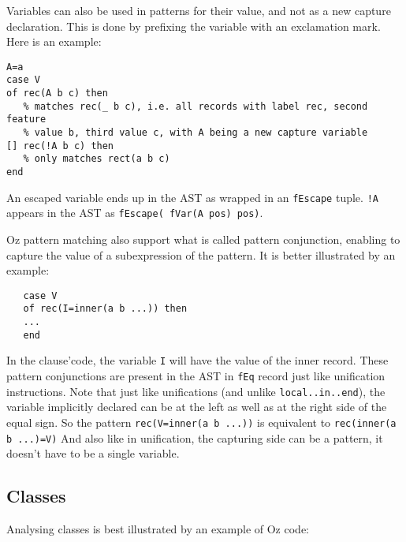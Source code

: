 \documentclass[a4paper]{memoir}
\begin{document}
Variables can also be used in patterns for their value, and not as a new capture
declaration. This is done by prefixing the variable with an exclamation mark.
Here is an example:

\begin{lstlisting}
A=a
case V
of rec(A b c) then
   % matches rec(_ b c), i.e. all records with label rec, second feature 
   % value b, third value c, with A being a new capture variable
[] rec(!A b c) then
   % only matches rect(a b c)
end
\end{lstlisting}

An escaped variable ends up in the AST as wrapped in an \lstinline!fEscape!
tuple. \lstinline$!A$ appears in the AST as \lstinline!fEscape( fVar(A pos) pos)!.

Oz pattern matching also support what is called pattern conjunction, enabling to
capture the value of a subexpression of the pattern. It is better
illustrated by an example:
\begin{lstlisting}
   case V 
   of rec(I=inner(a b ...)) then
   ...
   end
\end{lstlisting}

In the clause'code, the variable \lstinline!I! will have the value of the inner record.
These pattern conjunctions are present in the AST in \lstinline!fEq! record just 
like unification instructions.
Note that just like unifications (and unlike \lstinline!local..in..end!), the variable implicitly declared can be at the
left as well as at the right side of the equal sign. So the pattern
\lstinline!rec(V=inner(a b ...))! is equivalent to \lstinline!rec(inner(a b ...)=V)!
And also like in unification, the capturing side can be a pattern, it doesn't
have to be a single variable.


\subsection{Classes}
Analysing classes is best illustrated by an example of Oz code:
\end{document}
